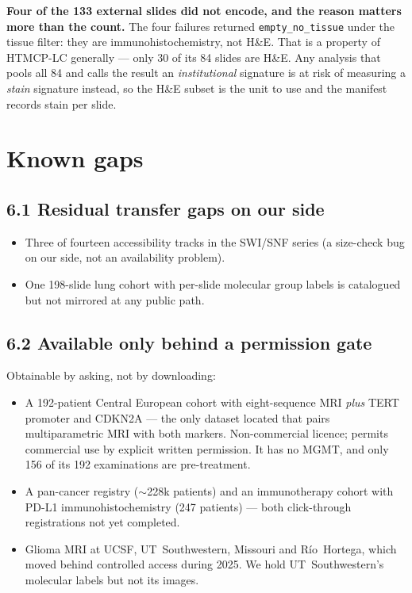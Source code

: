 \documentclass[11pt,a4paper]{article}
\begin{document}
\textbf{Four of the 133 external slides did not encode, and the reason matters more than the
count.} The four failures returned \texttt{empty\_no\_tissue} under the tissue filter: they are
immunohistochemistry, not H\&E. That is a property of HTMCP-LC generally --- only 30 of its 84
slides are H\&E. Any analysis that pools all 84 and calls the result an \emph{institutional}
signature is at risk of measuring a \emph{stain} signature instead, so the H\&E subset is the
unit to use and the manifest records stain per slide.

\section{Known gaps}

\subsection*{6.1 Residual transfer gaps on our side}
\begin{itemize}[leftmargin=1.4em,nosep]
\item Three of fourteen accessibility tracks in the SWI/SNF series (a size-check bug on
our side, not an availability problem).
\item One 198-slide lung cohort with per-slide molecular group labels is catalogued but
not mirrored at any public path.
\end{itemize}

\subsection*{6.2 Available only behind a permission gate}
Obtainable by asking, not by downloading:
\begin{itemize}[leftmargin=1.4em,nosep]
\item A 192-patient Central European cohort with eight-sequence MRI \emph{plus} TERT
promoter and CDKN2A --- the only dataset located that pairs multiparametric MRI with both
markers. Non-commercial licence; permits commercial use by explicit written permission.
It has no MGMT, and only 156 of its 192 examinations are pre-treatment.
\item A pan-cancer registry ($\sim$228k patients) and an immunotherapy cohort with PD-L1
immunohistochemistry (247 patients) --- both click-through registrations not yet completed.
\item Glioma MRI at UCSF, UT~Southwestern, Missouri and Río~Hortega, which moved behind
controlled access during 2025. We hold UT~Southwestern's molecular labels but not its
images.
\end{itemize}
\end{document}
